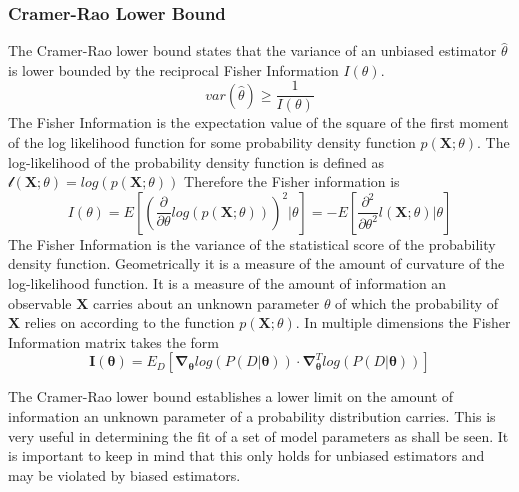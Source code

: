 \subsubsection{Cramer-Rao Lower Bound}
The Cramer-Rao lower bound states that the variance of an unbiased estimator $\hat{\theta}$ is lower bounded by the reciprocal Fisher Information $I(\theta)$.\cite{cramer} 
\begin{equation}
var(\hat{\theta}) \geq \frac{1}{I(\theta)}
\label{eq:cramerao}
\end{equation}
The Fisher Information is the expectation value of the square of the first moment of the log likelihood function for some probability density function $p(\mathbf{X};\theta)$. The log-likelihood of the probability density function is defined as $\mathcal{l}(\mathbf{X};\theta) = log(p(\mathbf{X};\theta))$
Therefore the Fisher information is 
\begin{equation}
I(\theta) = E\left[\left(\frac{\partial}{\partial \theta} log (p(\mathbf{X};\theta)) \right)^2 \Big| \theta \right] = -E\left[\frac{\partial^2}{\partial\theta^2} l(\mathbf{X};\theta) \Big| \theta \right]
\label{eq:fisherinformation}
\end{equation}
The Fisher Information is the variance of the statistical score of the probability density function. Geometrically it is a measure of the amount of curvature of the log-likelihood function. It is a measure of the amount of information an observable $\mathbf{X}$ carries about an unknown parameter $\theta$ of which the probability of $\mathbf{X}$ relies on according to the function $p(\mathbf{X};\theta)$. In multiple dimensions the Fisher Information matrix takes the form 
\begin{equation}
\mathbf{I}(\mathbf{\theta}) = E_D[\mathbf{\nabla}_\mathbf{\theta}log(P(D|\mathbf{\theta}))\cdot \mathbf{\nabla}^T_\mathbf{\theta}log(P(D|\mathbf{\theta}))]
\label{eq:fishermatrix}
\end{equation}

The Cramer-Rao lower bound establishes a lower limit on the amount of information an unknown parameter of a probability distribution carries.\cite{cramerrao2} This is very useful in determining the fit of a set of model parameters as shall be seen. It is important to keep in mind that this only holds for unbiased estimators and may be violated by biased estimators. 

